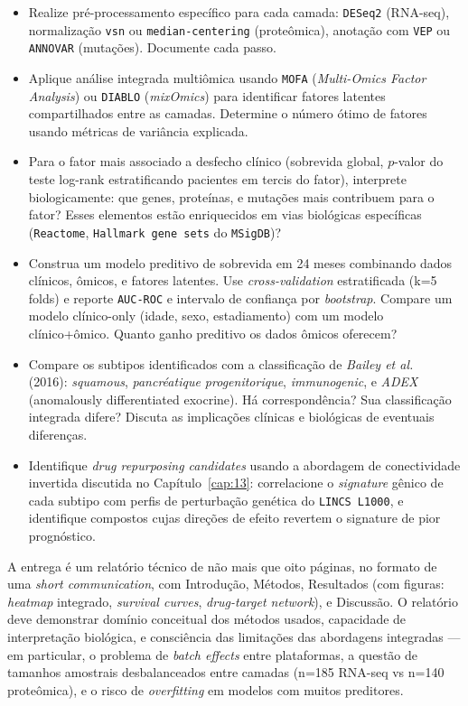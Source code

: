 \begin{exercicio}[$\star\star\star\star$]
\begin{itemize}
  \item[(a)] Realize pré-processamento específico para cada camada: \texttt{DESeq2} (RNA-seq), normalização \texttt{vsn} ou \texttt{median-centering} (proteômica), anotação com \texttt{VEP} ou \texttt{ANNOVAR} (mutações). Documente cada passo.
  \item[(b)] Aplique análise integrada multiômica usando \texttt{MOFA} (\emph{Multi-Omics Factor Analysis}) ou \texttt{DIABLO} (\emph{mixOmics}) para identificar fatores latentes compartilhados entre as camadas. Determine o número ótimo de fatores usando métricas de variância explicada.
  \item[(c)] Para o fator mais associado a desfecho clínico (sobrevida global, \(p\)-valor do teste log-rank estratificando pacientes em tercis do fator), interprete biologicamente: que genes, proteínas, e mutações mais contribuem para o fator? Esses elementos estão enriquecidos em vias biológicas específicas (\texttt{Reactome}, \texttt{Hallmark gene sets} do \texttt{MSigDB})?
  \item[(d)] Construa um modelo preditivo de sobrevida em 24 meses combinando dados clínicos, ômicos, e fatores latentes. Use \emph{cross-validation} estratificada (k=5 folds) e reporte \texttt{AUC-ROC} e intervalo de confiança por \emph{bootstrap}. Compare um modelo clínico-only (idade, sexo, estadiamento) com um modelo clínico+ômico. Quanto ganho preditivo os dados ômicos oferecem?
  \item[(e)] Compare os subtipos identificados com a classificação de \emph{Bailey et al.\\} (2016): \emph{squamous}, \emph{pancréatique progenitorique}, \emph{immunogenic}, e \emph{ADEX} (anomalously differentiated exocrine). Há correspondência? Sua classificação integrada difere? Discuta as implicações clínicas e biológicas de eventuais diferenças.
  \item[(f)] Identifique \emph{drug repurposing candidates} usando a abordagem de conectividade invertida discutida no Capítulo~\ref{cap:13}: correlacione o \emph{signature} gênico de cada subtipo com perfis de perturbação genética do \texttt{LINCS L1000}, e identifique compostos cujas direções de efeito revertem o signature de pior prognóstico.
\end{itemize}
A entrega é um relatório técnico de não mais que oito páginas, no formato de uma \emph{short communication}, com Introdução, Métodos, Resultados (com figuras: \emph{heatmap} integrado, \emph{survival curves}, \emph{drug-target network}), e Discussão. O relatório deve demonstrar domínio conceitual dos métodos usados, capacidade de interpretação biológica, e consciência das limitações das abordagens integradas --- em particular, o problema de \emph{batch effects} entre plataformas, a questão de tamanhos amostrais desbalanceados entre camadas (n=185 RNA-seq vs n=140 proteômica), e o risco de \emph{overfitting} em modelos com muitos preditores.
\end{exercicio}


